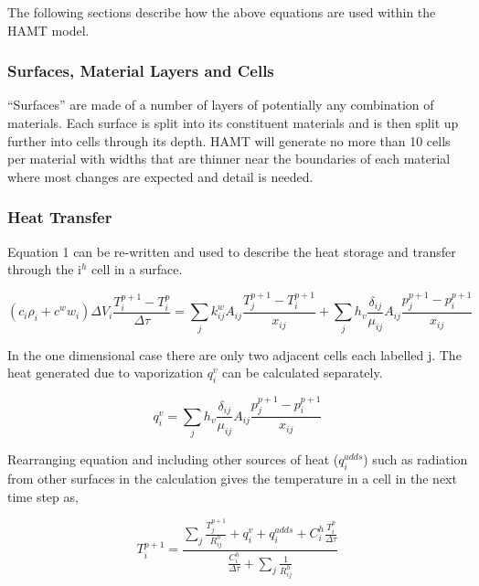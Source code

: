The following sections describe how the above equations are used within the HAMT model.

\subsubsection{Surfaces, Material Layers and Cells}\label{surfaces-material-layers-and-cells}

``Surfaces'' are made of a number of layers of potentially any combination of materials. Each surface is split into its constituent materials and is then split up further into cells through its depth. HAMT will generate no more than 10 cells per material with widths that are thinner near the boundaries of each material where most changes are expected and detail is needed.

\subsubsection{Heat Transfer}\label{heat-transfer}

Equation 1 can be re-written and used to describe the heat storage and transfer through the i\(^{h}\) cell in a surface.

\begin{equation}
\left( {{c_i}{\rho_i} + {c^w}{w_i}} \right)\Delta {V_i}\frac{{T_i^{p + 1} - T_i^p}}{{\Delta \tau }} = \sum\limits_j {k_{ij}^w{A_{ij}}\frac{{T_j^{p + 1} - T_i^{p + 1}}}{{{x_{ij}}}}}  + \sum\limits_j {{h_v}\frac{{{\delta_{ij}}}}{{{\mu_{ij}}}}{A_{ij}}\frac{{p_j^{p + 1} - p_i^{p + 1}}}{{{x_{ij}}}}}
\end{equation}

In the one dimensional case there are only two adjacent cells each labelled j. The heat generated due to vaporization \(q_i^v\) can be calculated separately.

\begin{equation}
q_i^v = \sum\limits_j {{h_v}\frac{{{\delta_{ij}}}}{{{\mu_{ij}}}}{A_{ij}}\frac{{p_j^{p + 1} - p_i^{p + 1}}}{{{x_{ij}}}}}
\end{equation}

Rearranging equation and including other sources of heat (\(q_i^{adds}\)) such as radiation from other surfaces in the calculation gives the temperature in a cell in the next time step as,

\begin{equation}
T_i^{p + 1} = \frac{{\sum\nolimits_j {\frac{{T_j^{p + 1}}}{{R_{ij}^h}}}  + q_i^v + q_i^{adds} + C_i^h\frac{{T_i^p}}{{\Delta \tau }}}}{{\frac{{C_i^h}}{{\Delta \tau }} + \sum\nolimits_j {\frac{1}{{R_{ij}^h}}} }}
\end{equation}

